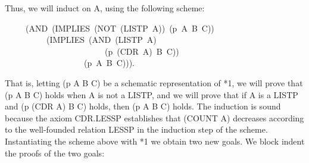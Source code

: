 \documentclass[10pt]{book}
\newenvironment{pubasis}{\begin{flushleft}}{\end{flushleft}}
\begin{document}
Thus, we will induct on A, using the following scheme:
\begin{pubasis}
~~~~~(AND~(IMPLIES~(NOT~(LISTP~A))~(p~A~B~C))\\
~~~~~~~~~~(IMPLIES~(AND~(LISTP~A)\\
~~~~~~~~~~~~~~~~~~~~~~~~(p~(CDR~A)~B~C))\\
~~~~~~~~~~~~~~~~~~~(p~A~B~C))).\\
\end{pubasis}
That is, letting (p A B C) be a schematic representation of *1,
we will prove that (p A B C) holds when A is not a LISTP, and we will
prove that if A is a LISTP and (p (CDR A) B C) holds, then (p A B C) holds.
The induction is sound because the axiom
CDR.LESSP establishes that (COUNT A) decreases according to
the well-founded relation LESSP in the induction step of the
scheme.  Instantiating the scheme above with
*1 we obtain two new goals.  We block indent the proofs of
the two goals:
\end{document}
